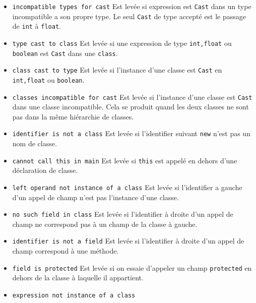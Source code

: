 \documentclass[a4paper, 10pt, french]{article}
\begin{document}
\begin{itemize}
\newline
Est levée si les operandes d'une comparaison n'ont pas le meme type. Notamment, on ne peut pas comparer un \texttt{int} et un \texttt{float}.
\item \texttt{incompatible types for cast}
\newline
Est levée si expression est \texttt{Cast} dans un type incompatible a son propre type. Le seul \texttt{Cast} de type accepté est le passage de \texttt{int} \`a \texttt{float}.
\item \texttt{type cast to class}
\newline
Est levée si une expression de type \texttt{int,float} ou \texttt{boolean} est \texttt{Cast} dans une \texttt{class}.
\item \texttt{class cast to type}
\newline
Est levée si l'instance d'une classe est \texttt{Cast} en \texttt{int,float} ou \texttt{boolean}.
\item \texttt{classes incompatible for cast}
\newline
Est levée si l'instance d'une classe est \texttt{Cast} dans une classe incompatible. Cela se produit quand les deux classes ne sont pas dans la même hiérarchie de classes.
\item \texttt{identifier is not a class}
\newline
Est levée si l'identifier suivant \texttt{new} n'est pas un nom de classe.
\item \texttt{cannot call this in main}
\newline
Est levée si \texttt{this} est appelé en dehors d'une déclaration de classe.
\item \texttt{left operand not instance of a class}
\newline
Est levée si l'identifier a gauche d'un appel de champ n'est pas l'instance d'une classe.
\item \texttt{no such field in class}
\newline
Est levée si l'identifier \`a droite d'un appel de champ ne correspond pas \`a un champ de la classe \`a gauche.
\item \texttt{identifier is not a field}
\newline
Est levée si l'identifier \`a droite d'un appel de champ correspond \`a une méthode.
\item \texttt{field is protected}
\newline
Est levée si on essaie d'appeler un champ \texttt{protected} en dehors de la classe \`a laquelle il appartient.
\item \texttt{expression not instance of a class}

\end{itemize}
\end{document}
